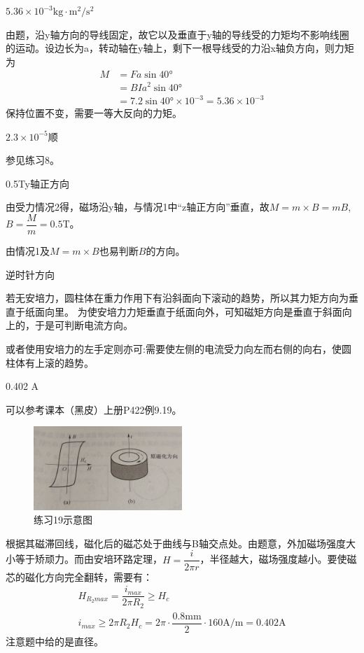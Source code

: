 \documentclass[b5paper,opensource]{./template/qyxf-book}
\begin{document}
$5.36\times 10^{-3}\textrm{kg}\cdot \textrm{m}^2/\textrm{s}^2$

\solve
由题，沿y轴方向的导线固定，故它以及垂直于y轴的导线受的力矩均不影响线圈的运动。设边长为a，转动轴在y轴上，剩下一根导线受的力沿x轴负方向，则力矩为
\begin{align*}
	M&=Fa\sin \ang{40}\\
	&=BIa^2\sin \ang{40}\\
	&=7.2\sin \ang{40}\times 10^{-3}=5.36\times 10^{-3}
\end{align*}
保持位置不变，需要一等大反向的力矩。

$2.3\times 10^{-5}$\quad 顺
 
\solve
参见练习8。

0.5T\quad y轴正方向

\solve
由受力情况2得，磁场沿y轴，与情况1中“z轴正方向”垂直，故$M=m\times B=mB$,$B=
\dfrac{M}{m}=0.5\textrm{T}$。

由情况1及$M=m\times B$也易判断$B$的方向。

逆时针方向

\solve
若无安培力，圆柱体在重力作用下有沿斜面向下滚动的趋势，所以其力矩方向为垂直于纸面向里。
为使安培力力矩垂直于纸面向外，可知磁矩方向是垂直于斜面向上的，于是可判断电流方向。

或者使用安培力的左手定则亦可:需要使左侧的电流受力向左而右侧的向右，使圆柱体有上滚的趋势。

0.402 A

\solve
可以参考课本（黑皮）上册\rm{P}422例9.19。
\begin{figure}[!h]	
	\centering	
	\includegraphics[width=0.5\textwidth]{Chp9_illus2.jpg}	
	\caption{练习19\quad 示意图}
\end{figure}

根据其磁滞回线，磁化后的磁芯处于曲线与B轴交点处。由题意，外加磁场强度大小等于矫顽力。而由安培环路定理，$H=\dfrac{i}{2\pi r}$，半径越大，磁场强度越小。要使磁芯的磁化方向完全翻转，需要有：
\begin{gather*}
	H_{R_2max}=\dfrac{i_{max}}{2\pi R_2}\geqslant H_c\\
	i_{max}\geqslant 2\pi R_2H_c=2\pi\cdot \dfrac{0.8\textrm{mm}}{2} \cdot 160\textrm{A/m}=0.402\textrm{A}
\end{gather*}
注意题中给的是直径。
\end{document}
